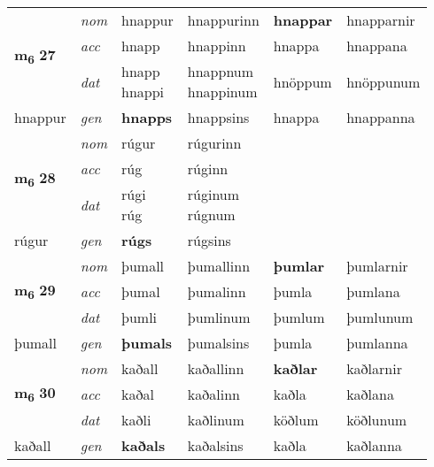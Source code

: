 \begin{longtable}[l]{llllll}
\multirow{3}{*}{{{\textbf{m{\textsubscript{6}}} \Large{\textbf{27}}}}}  & {\footnotesize{{\textit{nom}}}} & hnappur & hnappurinn    & \textbf{hnappar} & hnapparnir  \\*
 &  {\footnotesize{{\textit{acc}}}} & hnapp  & hnappinn   & hnappa  & hnappana \\*
 &  {\footnotesize{{\textit{dat}}}} & \specialcell{hnapp\\ hnappi} & \specialcell{hnappnum\\ hnappinum}   & hnöppum & hnöppunum \\*
 {\footnotesize{hnappur}} &   {\footnotesize{{\textit{gen}}}} & \textbf{hnapps}  & hnappsins  & hnappa & hnappanna \\
\cmidrule{1-6}


\multirow{3}{*}{{{\textbf{m{\textsubscript{6}}} \Large{\textbf{28}}}}}  & {\footnotesize{{\textit{nom}}}} & rúgur & rúgurinn    & \textbf{} &   \\*
 &  {\footnotesize{{\textit{acc}}}} & rúg  & rúginn   &   &  \\*
 &  {\footnotesize{{\textit{dat}}}} & \specialcell{rúgi\\ rúg} & \specialcell{rúginum\\ rúgnum}   &  &  \\*
 {\footnotesize{rúgur}} &   {\footnotesize{{\textit{gen}}}} & \textbf{rúgs}  & rúgsins  &  &  \\
\cmidrule{1-6}


\multirow{3}{*}{{{\textbf{m{\textsubscript{6}}} \Large{\textbf{29}}}}}  & {\footnotesize{{\textit{nom}}}} & þumall & þumallinn    & \textbf{þumlar} & þumlarnir  \\*
 &  {\footnotesize{{\textit{acc}}}} & þumal  & þumalinn   & þumla  & þumlana \\*
 &  {\footnotesize{{\textit{dat}}}} & þumli & þumlinum   & þumlum & þumlunum \\*
 {\footnotesize{þumall}} &   {\footnotesize{{\textit{gen}}}} & \textbf{þumals}  & þumalsins  & þumla & þumlanna \\
\cmidrule{1-6}


\multirow{3}{*}{{{\textbf{m{\textsubscript{6}}} \Large{\textbf{30}}}}}  & {\footnotesize{{\textit{nom}}}} & kaðall & kaðallinn    & \textbf{kaðlar} & kaðlarnir  \\*
 &  {\footnotesize{{\textit{acc}}}} & kaðal  & kaðalinn   & kaðla  & kaðlana \\*
 &  {\footnotesize{{\textit{dat}}}} & kaðli & kaðlinum   & köðlum & köðlunum \\*
 {\footnotesize{kaðall}} &   {\footnotesize{{\textit{gen}}}} & \textbf{kaðals}  & kaðalsins  & kaðla & kaðlanna \\
\cmidrule{1-6}



\end{longtable}
